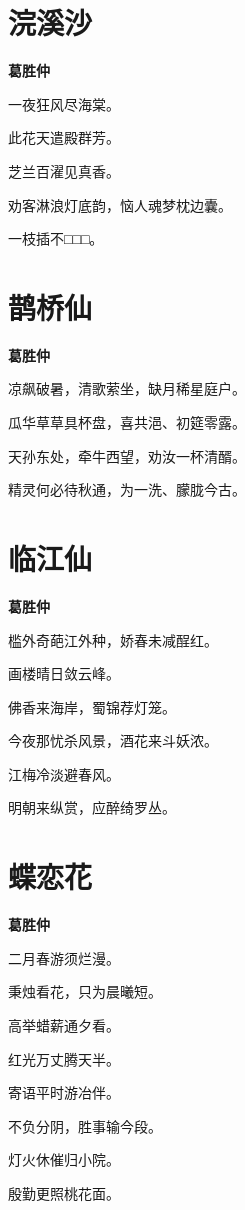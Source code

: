 \documentclass[12pt,a4paper]{ctexbook}
\begin{document}
\section{浣溪沙}
\textbf{葛胜仲}\par\vspace{0.5em}
一夜狂风尽海棠。\par
此花天遣殿群芳。\par
芝兰百濯见真香。\par
劝客淋浪灯底韵，恼人魂梦枕边囊。\par
一枝插不□□□。\par

\section{鹊桥仙}
\textbf{葛胜仲}\par\vspace{0.5em}
凉飙破暑，清歌萦坐，缺月稀星庭户。\par
瓜华草草具杯盘，喜共浥、初筵零露。\par
天孙东处，牵牛西望，劝汝一杯清醑。\par
精灵何必待秋通，为一洗、朦胧今古。\par

\section{临江仙}
\textbf{葛胜仲}\par\vspace{0.5em}
槛外奇葩江外种，娇春未减酲红。\par
画楼晴日敛云峰。\par
佛香来海岸，蜀锦荐灯笼。\par
今夜那忧杀风景，酒花来斗妖浓。\par
江梅冷淡避春风。\par
明朝来纵赏，应醉绮罗丛。\par

\section{蝶恋花}
\textbf{葛胜仲}\par\vspace{0.5em}
二月春游须烂漫。\par
秉烛看花，只为晨曦短。\par
高举蜡薪通夕看。\par
红光万丈腾天半。\par
寄语平时游冶伴。\par
不负分阴，胜事输今段。\par
灯火休催归小院。\par
殷勤更照桃花面。\par
\end{document}
